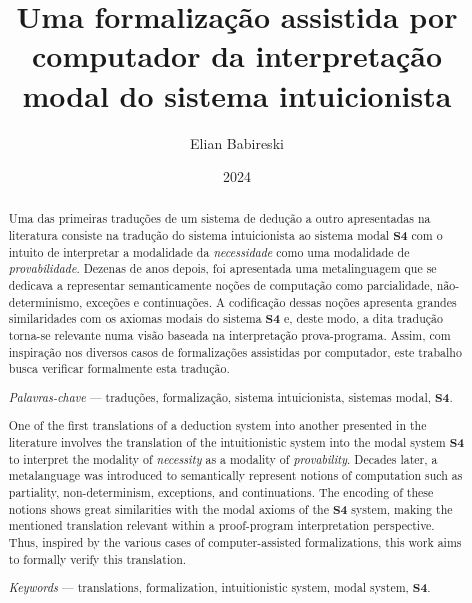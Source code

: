 


    \title{Uma formalização assistida por computador da interpretação modal do sistema intuicionista}
    \author{Elian Babireski}
    \date{2024}

    \maketitle

    
    
    

    \begin{abstract}
        Uma das primeiras traduções de um sistema de dedução a outro apresentadas na literatura consiste na tradução do sistema intuicionista ao sistema modal $\mathbf{S4}$ com o intuito de interpretar a modalidade da \emph{necessidade} como uma modalidade de \emph{provabilidade}. Dezenas de anos depois, foi apresentada uma metalinguagem que se dedicava a representar semanticamente noções de computação como parcialidade, não-determinismo, exceções e continuações. A codificação dessas noções apresenta grandes similaridades com os axiomas modais do sistema $\mathbf{S4}$ e, deste modo, a dita tradução torna-se relevante numa visão baseada na interpretação prova-programa. Assim, com inspiração nos diversos casos de formalizações assistidas por computador, este trabalho busca verificar formalmente esta tradução.

        \textit{Palavras-chave} --- traduções, formalização, sistema intuicionista, sistemas modal, $\mathbf{S4}$.
    \end{abstract}

    \begin{otherlanguage}{english} 
        \begin{abstract}
            One of the first translations of a deduction system into another presented in the literature involves the translation of the intuitionistic system into the modal system $\mathbf{S4}$ to interpret the modality of \emph{necessity} as a modality of \emph{provability}. Decades later, a metalanguage was introduced to semantically represent notions of computation such as partiality, non-determinism, exceptions, and continuations. The encoding of these notions shows great similarities with the modal axioms of the $\mathbf{S4}$ system, making the mentioned translation relevant within a proof-program interpretation perspective. Thus, inspired by the various cases of computer-assisted formalizations, this work aims to formally verify this translation.

            \textit{Keywords} --- translations, formalization, intuitionistic system, modal system, $\mathbf{S4}$.
        \end{abstract}
    \end{otherlanguage}

